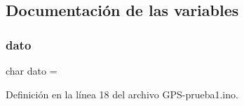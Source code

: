 \subsection{Documentación de las variables}
\mbox{\label{_g_p_s-prueba1_8ino_a27c4b81ab2ec9e3399303a0e0398c36d}} 
\subsubsection{\texorpdfstring{dato}{dato}}
{\footnotesize\ttfamily char dato =\textquotesingle{} \textquotesingle{}}



Definición en la línea 18 del archivo G\+P\+S-\/prueba1.\+ino.

